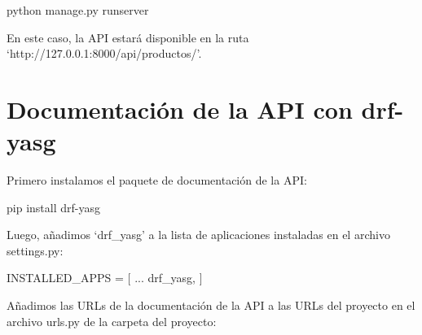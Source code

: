 \documentclass[
  a4paper,
  DIV=11,
  numbers=noendperiod,
  onepage,
  openany]{scrreprt}
\newenvironment{Shaded}{\begin{snugshade}}{\end{snugshade}}
\newcommand{\ExtensionTok}[1]{\textcolor[rgb]{0.00,0.23,0.31}{#1}}
\newcommand{\NormalTok}[1]{\textcolor[rgb]{0.00,0.23,0.31}{#1}}
\newcommand{\OperatorTok}[1]{\textcolor[rgb]{0.37,0.37,0.37}{#1}}
\newcommand{\StringTok}[1]{\textcolor[rgb]{0.13,0.47,0.30}{#1}}
\begin{document}
\begin{Shaded}
\begin{Highlighting}[]
\ExtensionTok{python}\NormalTok{ manage.py runserver}
\end{Highlighting}
\end{Shaded}

En este caso, la API estará disponible en la ruta
`http://127.0.0.1:8000/api/productos/'.

\chapter{Documentación de la API con
drf-yasg}\label{documentaciuxf3n-de-la-api-con-drf-yasg}

Primero instalamos el paquete de documentación de la API:

\begin{Shaded}
\begin{Highlighting}[]
\ExtensionTok{pip}\NormalTok{ install drf{-}yasg}
\end{Highlighting}
\end{Shaded}

Luego, añadimos `drf\_yasg' a la lista de aplicaciones instaladas en el
archivo settings.py:

\begin{Shaded}
\begin{Highlighting}[]
\NormalTok{INSTALLED\_APPS }\OperatorTok{=}\NormalTok{ [}
\NormalTok{    ...}
    \StringTok{\textquotesingle{}drf\_yasg\textquotesingle{}}\NormalTok{,}
\NormalTok{]}
\end{Highlighting}
\end{Shaded}

Añadimos las URLs de la documentación de la API a las URLs del proyecto
en el archivo urls.py de la carpeta del proyecto:
\end{document}
